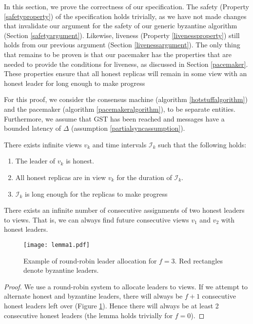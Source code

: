 In this section, we prove the correctness of our specification. The safety (Property \ref{safetyproperty}) of the specification holds trivially, as we have not made changes that invalidate our argument for the safety of our generic byzantine algorithm (Section \ref{safetyargument}). Likewise, liveness (Property \ref{livenessproperty}) still holds from our previous argument (Section \ref{livenessargument}). The only thing that remains to be proven is that our pacemaker has the properties that are needed to provide the conditions for liveness, as discussed in Section \ref{pacemaker}. These properties ensure that all honest replicas will remain in some view with an honest leader for long enough to make progress

For this proof, we consider the consensus machine (algorithm \ref{hotstuffalgorithm}) and the pacemaker (algorithm \ref{pacemakeralgorithm}), to be separate entities. Furthermore, we assume that GST has been reached and messages have a bounded latency of $\Delta$ (assumption \ref{partialsyncassumption}).

\begin{theorem} \label{viewsync}
	There exists infinite views $v_k$ and time intervals $\mathcal{I}_k$ such that the following holds:
	\begin{enumerate}
		\item The leader of $v_k$ is honest.
		\item All honest replicas are in view $v_k$ for the duration of $\mathcal{I}_k$.
		\item $\mathcal{I}_k$ is long enough for the replicas to make progress
	\end{enumerate}
\end{theorem}

\begin{lemma} \label{viewslemma}
	There exists an infinite number of consecutive assignments of two honest leaders to views. That is, we can always find future consecutive views $v_1$ and $v_2$ with honest leaders.
\end{lemma}

\begin{figure}[h!]
	\centering
	\texttt{[image: lemma1.pdf]}
	\caption{Example of round-robin leader allocation for $f = 3$. Red rectangles denote byzantine leaders.}
	\label{lemma1diagram}
\end{figure}

\begin{proof}
	We use a round-robin system to allocate leaders to views. If we attempt to alternate honest and byzantine leaders, there will always be $f + 1$ consecutive honest leaders left over (Figure \ref{lemma1diagram}). Hence there will always be at least 2 consecutive honest leaders (the lemma holds trivially for $f = 0$).
\end{proof}

